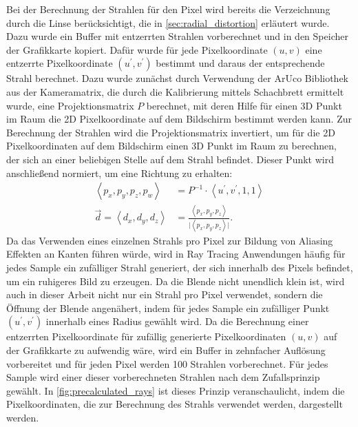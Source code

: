 \documentclass[thesis.tex]{subfiles}
\begin{document}
Bei der Berechnung der Strahlen für den Pixel wird bereits die Verzeichnung durch die Linse berücksichtigt, die in \autoref{sec:radial_distortion} erläutert wurde. Dazu wurde ein Buffer mit entzerrten Strahlen vorberechnet und in den Speicher der Grafikkarte kopiert. Dafür wurde für jede Pixelkoordinate $(u, v)$ eine entzerrte Pixelkoordinate $(u^{'}, v^{'})$ bestimmt und daraus der entsprechende Strahl berechnet. Dazu wurde zunächst durch Verwendung der ArUco Bibliothek aus der Kameramatrix, die durch die Kalibrierung mittels Schachbrett ermittelt wurde, eine Projektionsmatrix $P$ berechnet, mit deren Hilfe für einen 3D Punkt im Raum die 2D Pixelkoordinate auf dem Bildschirm bestimmt werden kann. Zur Berechnung der Strahlen wird die Projektionsmatrix invertiert, um für die 2D Pixelkoordinaten auf dem Bildschirm einen 3D Punkt im Raum zu berechnen, der sich an einer beliebigen Stelle auf dem Strahl befindet. Dieser Punkt wird anschließend normiert, um eine Richtung zu erhalten:
%
\begin{equation}
\begin{aligned}
\left<p_{x}, p_{y}, p_{z}, p_{w}\right> &= P^{-1} \cdot \left<u^{'}, v^{'}, 1, 1\right>\\
\vec d = \left<d_{x}, d_{y}, d_{z}\right> &= \frac{\left<p_{x}, p_{y}, p_{z}\right>}{\lvert\left<p_{x}, p_{y}, p_{z}\right>\rvert}.
\end{aligned}
\end{equation}
%
Da das Verwenden eines einzelnen Strahls pro Pixel zur Bildung von Aliasing Effekten an Kanten führen würde, wird in Ray Tracing Anwendungen häufig für jedes Sample ein zufälliger Strahl generiert, der sich innerhalb des Pixels befindet, um ein ruhigeres Bild zu erzeugen. Da die Blende nicht unendlich klein ist, wird auch in dieser Arbeit nicht nur ein Strahl pro Pixel verwendet, sondern die Öffnung der Blende angenähert, indem für jedes Sample ein zufälliger Punkt $(u^{'}, v^{'})$ innerhalb eines Radius gewählt wird. Da die Berechnung einer entzerrten Pixelkoordinate für zufällig generierte Pixelkoordinaten $(u, v)$ auf der Grafikkarte zu aufwendig wäre, wird ein Buffer in zehnfacher Auflösung vorbereitet und für jeden Pixel werden 100 Strahlen vorberechnet. Für jedes Sample wird einer dieser vorberechneten Strahlen nach dem Zufallsprinzip gewählt. In \autoref{fig:precalculated_rays} ist dieses Prinzip veranschaulicht, indem die Pixelkoordinaten, die zur Berechnung des Strahls verwendet werden, dargestellt werden.
\end{document}
